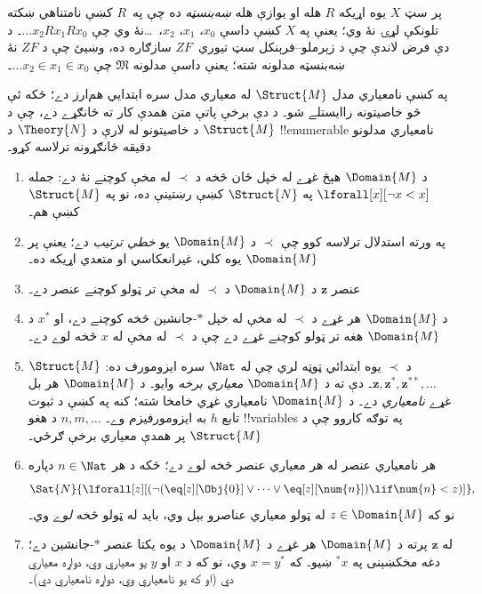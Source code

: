 \documentclass[../../../include/open-logic-section]{subfiles}
\begin{document}
\begin{prob}
پر سټ $X$ يوه اړيکه $R$ هله او يوازې هله \emph{ښه‌بنسټه} ده چې په~$R$ کښې نامتناهي ښکته تلونکې لړۍ نۀ وي؛ يعنې په $X$ کښې داسې $x_0$، $x_1$، $x_2$،~\dots نۀ وي چې $\dots x_2Rx_1Rx_0$۔ د دې فرض لاندې چې د زېرملو--فرېنکل سټ تيوري~$ZF$ سازګاره ده، وښيئ چې د $ZF$ نۀ ښه‌بنسټه مدلونه شته؛ يعنې داسې مدلونه $\mathfrak{M}$ چې $\dots x_2 \in x_1 \in x_0$۔
\end{prob}

په  کښې نامعياري مدل $\Struct{M}$ له معياري مدل سره ابتدايي هم‌ارز دے؛ ځکه ئې څو خاصيتونه راايستلے شو۔ د دې برخې پاتې متن همدې کار ته ځانګړے دے، چې د $\Struct{M}$ د خاصيتونو له لارې د $\Theory{N}$ د !!{enumerable} نامعياري مدلونو دقيقه ځانګړونه ترلاسه کړو۔

\begin{enumerate}
\item د $\Domain{M}$ هېڅ غړے له خپل ځان څخه د $\prec$ له مخې کوچنے نۀ دے: جمله $\lforall[x][\lnot x < x]$ په $\Struct{N}$ کښې رښتينې ده، نو په $\Struct{M}$ کښې هم۔
\item په ورته استدلال ترلاسه کوو چې $\prec$ د $\Domain{M}$ يو \emph{خطي ترتيب} دے؛ يعنې پر $\Domain{M}$ يوه کلي، غيرانعکاسي او متعدي اړيکه ده۔
\item عنصر $\mathbf{z}$ د $\Domain{M}$ د $\prec$ له مخې تر ټولو کوچنے عنصر دے۔
\item د $\Domain{M}$ هر غړے د $\prec$ له مخې له خپل $*$-جانشين څخه کوچنے دے، او $x^*$ د $\Domain{M}$ هغه تر ټولو کوچنے غړے دے چې د $\prec$ له مخې له $x$ څخه لوے دے۔
\item $\Struct{M}$ د $\prec$ يوه ابتدائي ټوټه لري چې له $\Nat$ سره ايزومورف ده: $\mathbf{z}, \mathbf{z}^*, \mathbf{z}^{**}, \dots$۔ دې ته د $\Domain{M}$ \emph{معياري برخه} وايو۔ د $\Domain{M}$ هر بل غړے \emph{نامعياري} دے۔ د $\Domain{M}$ نامعياري غړي خامخا شته؛ کنه په  کښې د ثبوت تابع $h$ به ايزومورفيزم وے۔ $n, m, \dots$ د هغو !!{variable}s په توګه کاروو چې د $\Struct{M}$ پر همدې معياري برخې ګرځي۔
\item هر نامعياري عنصر له هر معياري عنصر څخه لوے دے؛ ځکه د هر $n \in \Nat$ دپاره
  \[
  \Sat{N}{\lforall[z][(\lnot(\eq[z][\Obj{0}] \lor
  \dots \lor \eq[z][\num{n}]) \lif \num{n} < z)]},
  \]
  نو که $z \in \Domain{M}$ له ټولو معياري عناصرو بېل وي، بايد له ټولو څخه \emph{لوے} وي۔
\item له $\mathbf{z}$ پرته د $\Domain{M}$ هر غړے د $\Domain{M}$ د يوه يکتا عنصر $*$-جانشين دے؛ دغه مخکښېنی په $^*x$ ښيو۔ که $x = y^*$ وي، نو که د $x$ او $y$ يو معياري وي، دواړه معياري دي (او که يو نامعياري وي، دواړه نامعياري دي)۔

\end{enumerate}
\end{document}
